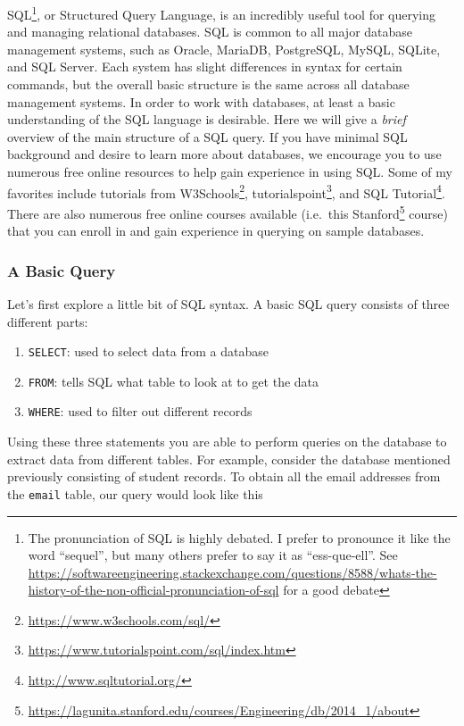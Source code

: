 \documentclass[]{krantz}
\providecommand{\tightlist}{%
  \setlength{\itemsep}{0pt}\setlength{\parskip}{0pt}}
\renewcommand{\href}[2]{#2\footnote{\url{#1}}}
\begin{document}
SQL\footnote{The pronunciation of SQL is highly debated. I prefer to pronounce it like the word ``sequel'', but many others prefer to say it as ``ess-que-ell''. See \url{https://softwareengineering.stackexchange.com/questions/8588/whats-the-history-of-the-non-official-pronunciation-of-sql} for a good debate}, or Structured Query Language, is an incredibly useful tool for querying and managing relational databases. SQL is common to all major database management systems, such as Oracle, MariaDB, PostgreSQL, MySQL, SQLite, and SQL Server. Each system has slight differences in syntax for certain commands, but the overall basic structure is the same across all database management systems. In order to work with databases, at least a basic understanding of the SQL language is desirable. Here we will give a \emph{brief} overview of the main structure of a SQL query. If you have minimal SQL background and desire to learn more about databases, we encourage you to use numerous free online resources to help gain experience in using SQL. Some of my favorites include tutorials from \href{https://www.w3schools.com/sql/}{W3Schools}, \href{https://www.tutorialspoint.com/sql/index.htm}{tutorialspoint}, and \href{http://www.sqltutorial.org/}{SQL Tutorial}. There are also numerous free online courses available (i.e.~this \href{https://lagunita.stanford.edu/courses/Engineering/db/2014_1/about}{Stanford} course) that you can enroll in and gain experience in querying on sample databases.

\hypertarget{a-basic-query}{%
\subsubsection{A Basic Query}\label{a-basic-query}}

Let's first explore a little bit of SQL syntax. A basic SQL query consists of three different parts:

\begin{enumerate}
\def\labelenumi{\arabic{enumi}.}
\tightlist
\item
  \texttt{SELECT}: used to select data from a database
\item
  \texttt{FROM}: tells SQL what table to look at to get the data
\item
  \texttt{WHERE}: used to filter out different records
\end{enumerate}

Using these three statements you are able to perform queries on the database to extract data from different tables. For example, consider the database mentioned previously consisting of student records. To obtain all the email addresses from the \texttt{email} table, our query would look like this
\end{document}
